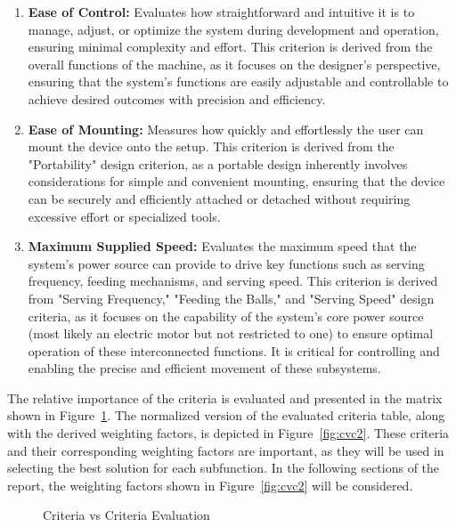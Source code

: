 \documentclass[12pt]{article}
\begin{document}
\begin{enumerate}
    \item \textbf{Ease of Control:} Evaluates how straightforward and intuitive it is to manage, adjust, or optimize the system during development and operation, ensuring minimal complexity and effort. This criterion is derived from the overall functions of the machine, as it focuses on the designer's perspective, ensuring that the system’s functions are easily adjustable and controllable to achieve desired outcomes with precision and efficiency.

    \item \textbf{Ease of Mounting:} Measures how quickly and effortlessly the user can mount the device onto the setup. This criterion is derived from the "Portability" design criterion, as a portable design inherently involves considerations for simple and convenient mounting, ensuring that the device can be securely and efficiently attached or detached without requiring excessive effort or specialized tools.


    \item \textbf{Maximum Supplied Speed:} Evaluates the maximum speed that the system’s power source can provide to drive key functions such as serving frequency, feeding mechanisms, and serving speed. This criterion is derived from "Serving Frequency," "Feeding the Balls," and "Serving Speed" design criteria, as it focuses on the capability of the system’s core power source (most likely an electric motor but not restricted to one) to ensure optimal operation of these interconnected functions. It is critical for controlling and enabling the precise and efficient movement of these subsystems.

    
\end{enumerate}

The relative importance of the criteria is evaluated and presented in the matrix shown in Figure~\ref{fig:cvc1}. The normalized version of the evaluated criteria table, along with the derived weighting factors, is depicted in Figure~\ref{fig:cvc2}. These criteria and their corresponding weighting factors are important, as they will be used in selecting the best solution for each subfunction. In the following sections of the report, the weighting factors shown in Figure~\ref{fig:cvc2} will be considered.


\begin{figure}[H]
    \centering
    \caption{Criteria vs Criteria Evaluation}
    \label{fig:cvc1}
\end{figure}
\end{document}
